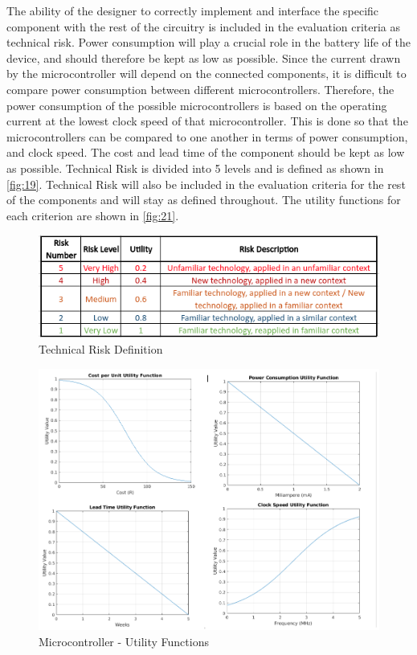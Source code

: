 The ability of the designer to correctly implement and interface the specific component with the rest of the circuitry is included in the evaluation criteria as technical risk. Power consumption will play a crucial role in the battery life of the device, and should therefore be kept as low as possible. Since the current drawn by the microcontroller will depend on the connected components, it is difficult to compare power consumption between different microcontrollers. Therefore, the power consumption of the possible microcontrollers is based on the operating current at the lowest clock speed of that microcontroller. This is done so that the microcontrollers can be compared to one another in terms of power consumption, and clock speed. The cost and lead time of the component should be kept as low as possible. Technical Risk is divided into 5 levels and is defined as shown in \autoref{fig:19}. Technical Risk will also be included in the evaluation criteria for the rest of the components and will stay as defined throughout. The utility functions for each criterion are shown in \autoref{fig:21}.
\begin{figure}[H]
	\centering
	\includegraphics[scale=0.7]{img/Technical Risk}
	\caption{Technical Risk Definition}
	\label{fig:19}
\end{figure}
\begin{figure}[H]
	\centering
	\includegraphics[scale=0.4]{img/M-Util}
	\caption{Microcontroller - Utility Functions}
	\label{fig:21}
\end{figure}
